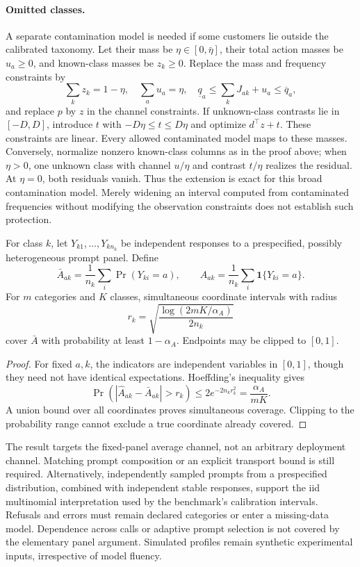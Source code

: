\paragraph{Omitted classes.}
A separate contamination model is needed if some customers lie outside the
calibrated taxonomy. Let their mass be $\eta\in[0,\bar\eta]$, their total action
masses be $u_a\geq0$, and known-class masses be $z_k\geq0$. Replace the mass and
frequency constraints by
\[
 \sum_k z_k=1-\eta,\quad \sum_a u_a=\eta,\quad
 \underline q_a\leq\sum_kJ_{ak}+u_a\leq\overline q_a,
\]
and replace $p$ by $z$ in the channel constraints. If unknown-class contrasts
lie in $[-D,D]$, introduce $t$ with $-D\eta\leq t\leq D\eta$ and optimize
$d^\top z+t$. These constraints are linear. Every allowed contaminated model
maps to these masses. Conversely, normalize nonzero known-class columns as in
the proof above; when $\eta>0$, one unknown class with channel $u/\eta$ and
contrast $t/\eta$ realizes the residual. At $\eta=0$, both residuals vanish.
Thus the extension is exact for this broad contamination model. Merely widening
an interval computed from contaminated frequencies without modifying the
observation constraints does not establish such protection.

\begin{proposition}
\label{prop:heterogeneous-panel}
For class $k$, let $Y_{k1},\ldots,Y_{kn_k}$ be independent responses to a
prespecified, possibly heterogeneous prompt panel. Define
\[
 \bar A_{ak}=\frac1{n_k}\sum_i\Pr(Y_{ki}=a),\qquad
 \widehat A_{ak}=\frac1{n_k}\sum_i\mathbf1\{Y_{ki}=a\}.
\]
For $m$ categories and $K$ classes, simultaneous coordinate intervals with
radius
\[
 r_k=\sqrt{\frac{\log(2mK/\alpha_A)}{2n_k}}
\]
cover $\bar A$ with probability at least $1-\alpha_A$. Endpoints may be clipped
to $[0,1]$.
\end{proposition}
\begin{proof}
For fixed $a,k$, the indicators are independent variables in $[0,1]$, though
they need not have identical expectations. Hoeffding's inequality gives
\[
 \Pr(|\widehat A_{ak}-\bar A_{ak}|>r_k)
 \leq 2e^{-2n_kr_k^2}=\frac{\alpha_A}{mK}.
\]
A union bound over all coordinates proves simultaneous coverage. Clipping to
the probability range cannot exclude a true coordinate already covered.
\end{proof}

The result targets the fixed-panel average channel, not an arbitrary deployment
channel. Matching prompt composition or an explicit transport bound is still
required. Alternatively, independently sampled prompts from a prespecified
distribution, combined with independent stable responses, support the iid
multinomial interpretation used by the benchmark's calibration intervals.
Refusals and errors must remain declared categories or enter a missing-data
model. Dependence across calls or adaptive prompt selection is not covered by
the elementary panel argument. Simulated profiles remain synthetic experimental
inputs, irrespective of model fluency.
